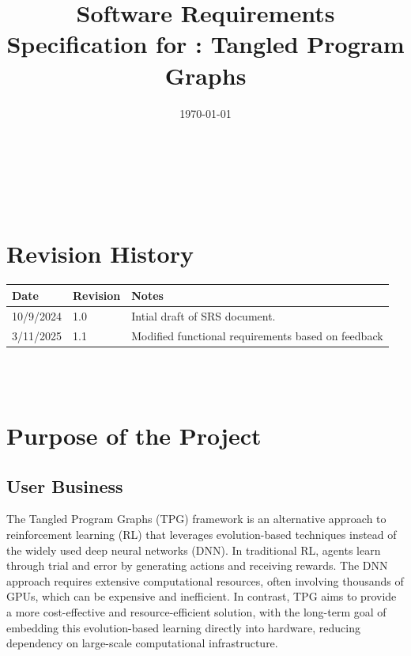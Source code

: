 \documentclass[12pt]{article}
\begin{document}
\title{Software Requirements Specification for \progname: Tangled Program Graphs} 
\author{\authname}
\date{\today}
	
\maketitle

~\newpage


\tableofcontents

~\newpage

\section*{Revision History}

\begin{tabularx}{\textwidth}{p{3cm}p{2cm}X}
\toprule {\textbf{Date}} & {\textbf{Revision}} & {\textbf{Notes}}\\
\midrule
10/9/2024 & 1.0 & Intial draft of SRS document.\\
3/11/2025 & 1.1 & Modified functional requirements based on feedback\\

\bottomrule
\end{tabularx}

~\\

~\newpage
\section{Purpose of the Project}
\subsection{User Business}
The Tangled Program Graphs (TPG) framework is an alternative approach to reinforcement learning (RL) that leverages evolution-based techniques instead of the widely used deep neural networks (DNN). In traditional RL, agents learn through trial and error by generating actions and receiving rewards. The DNN approach requires extensive computational resources, often involving thousands of GPUs, which can be expensive and inefficient. In contrast, TPG aims to provide a more cost-effective and resource-efficient solution, with the long-term goal of embedding this evolution-based learning directly into hardware, reducing dependency on large-scale computational infrastructure.
\end{document}
